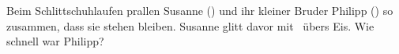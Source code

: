 Beim Schlittschuhlaufen prallen Susanne (\mSuO) und ihr kleiner Bruder Philipp (\mPhO) so zusammen, dass sie stehen bleiben. Susanne glitt davor mit \vSuO\ übers Eis. Wie schnell war Philipp?
